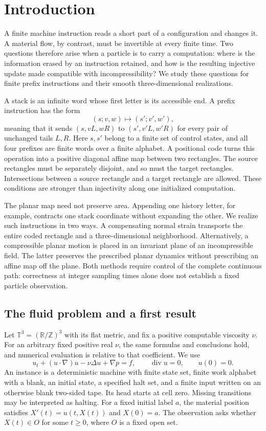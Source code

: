 \section{Introduction}
A finite machine instruction reads a short part of a configuration and
changes it. A material flow, by contrast, must be invertible at every
finite time. Two questions therefore arise when a particle is to carry a
computation: where is the information erased by an instruction retained,
and how is the resulting injective update made compatible with
incompressibility? We study these questions for finite prefix instructions
and their smooth three-dimensional realizations.

A stack is an infinite word whose first letter is its accessible end.
A prefix instruction has the form
\[
 (s;v,w)\longmapsto(s';v',w'),
\]
meaning that it sends $(s,vL,wR)$ to $(s',v'L,w'R)$ for every pair of
unchanged tails $L,R$. Here $s,s'$ belong to a finite set of control
states, and all four prefixes are finite words over a finite alphabet.
A positional code turns this operation into a positive diagonal affine
map between two rectangles. The source rectangles must be separately
disjoint, and so must the target rectangles. Intersections between a
source rectangle and a target rectangle are allowed. These conditions
are stronger than injectivity along one initialized computation.

The planar map need not preserve area. Appending one history letter,
for example, contracts one stack coordinate without expanding the
other. We realize such instructions in two ways. A compensating normal
strain transports the entire coded rectangle and a three-dimensional
neighborhood. Alternatively, a compressible planar motion is placed in
an invariant plane of an incompressible field. The latter preserves the
prescribed planar dynamics without prescribing an affine map off the
plane. Both methods require control of the complete continuous path:
correctness at integer sampling times alone does not establish a fixed
particle observation.

\subsection{The fluid problem and a first result}
Let $\mathbb T^3=(\mathbb R/\mathbb Z)^3$ with its flat metric, and fix a
positive computable viscosity $\nu$. For an arbitrary fixed positive real
$\nu$, the same formulas and conclusions hold, and numerical evaluation
is relative to that coefficient. We use
\begin{equation}\label{eq:sheets-ns}
 u_t+(u\cdot\nabla)u-\nu\Delta u+\nabla p=f,
 \qquad \operatorname{div}u=0,\qquad u(0)=0.
\end{equation}
An instance is a deterministic machine with finite state set, finite work
alphabet with a blank, an initial state, a specified halt set, and a
finite input written on an otherwise blank two-sided tape. Its head
starts at cell zero. Missing transitions may be interpreted as halting.
For a fixed initial label $a$, the material position satisfies
$X'(t)=u(t,X(t))$ and $X(0)=a$. The observation asks whether
$X(t)\in O$ for some $t\ge0$, where $O$ is a fixed open set.

